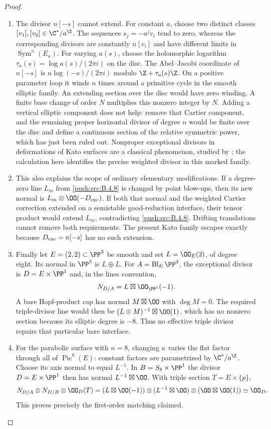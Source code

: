 \begin{proof}
\begin{enumerate}[label=\arabic*.,leftmargin=*]
\item The divisor $n[-s]$ cannot extend. For constant $a$, choose two
distinct classes $[v_1],[v_2]\in\C^*/a^\Z$.
The sequences $s_j=-a^jv_i$ tend to zero, whereas the corresponding
divisors are constantly $n[v_i]$ and have different limits in
$\operatorname{Sym}^n(E_a)$.
For varying $a(s)$, choose the holomorphic logarithm
$\tau_a(s)=\log a(s)/(2\pi i)$ on the disc.
The Abel--Jacobi coordinate of $n[-s]$ is
$n\log(-s)/(2\pi i)$ modulo $\Z+\tau_a(s)\Z$.
On a positive parameter loop it winds $n$ times around a primitive
cycle in the smooth elliptic family. An extending section over the
disc would have zero winding. A finite base change of order $N$
multiplies this nonzero integer by $N$.
Adding a vertical elliptic component does not help: remove that
Cartier component, and the remaining proper horizontal divisor of
degree $n$ would be finite over the disc and define a continuous
section of the relative symmetric power, which has just been ruled
out. Nonproper exceptional divisors in deformations of Kato surfaces
are a classical phenomenon, studied by
\citet[Section 1.2]{DlousskyTeleman2012AB}; the calculation here
identifies the precise weighted divisor in this marked family.

\item This also explains the scope of ordinary elementary modifications.
If a degree-zero line $L_m$ from \ref{push:src:B.4.8} is changed by point blow-ups,
then its new normal is $L_m\otimes\OO(-D_{\rm exc})$.
If both that normal and the weighted Cartier correction extended on
a semistable good-reduction interface, their tensor product would
extend $L_m$, contradicting \ref{push:src:B.4.8}. Drifting translations cannot
remove both requirements. The present Kato family escapes exactly
because $D_{\rm exc}=n[-s]$ has no such extension.

\item Finally let $E=(2,2)\subset\PP^3$ be smooth and set
$L=\OO_E(2)$, of degree eight. Its normal in $\PP^3$ is
$L\oplus L$. For $A=\operatorname{Bl}_E\PP^3$, the exceptional
divisor is $D=E\times\PP^1$ and, in the lines convention,
\[
 N_{D/A}=L\boxtimes\OO_{\PP^1}(-1).
\]
A bare Hopf-product cap has normal $M\boxtimes\OO$ with
$\deg M=0$. The required triple-divisor line would then be
$(L\otimes M)^{-1}\boxtimes\OO(1)$, which has no nonzero section
because its elliptic degree is $-8$. Thus no effective triple divisor
repairs that particular bare interface.

\item For the parabolic surface with $n=8$, changing $\kappa$ varies the
flat factor through all of $\operatorname{Pic}^0(E)$:
constant factors are parametrized by $\C^*/a^\Z$.
Choose its axis normal to equal $L^{-1}$.
In $B=S_8\times\PP^1$ the divisor $D=E\times\PP^1$ then has normal
$L^{-1}\boxtimes\OO$. With triple section $T=E\times\{p\}$,
\[
 N_{D/A}\otimes N_{D/B}\otimes\OO_D(T)
   =(L\boxtimes\OO(-1))\otimes
     (L^{-1}\boxtimes\OO)\otimes(\OO\boxtimes\OO(1))
   \simeq\OO_D.
\]
This proves precisely the first-order matching claimed.
\end{enumerate}
\end{proof}


